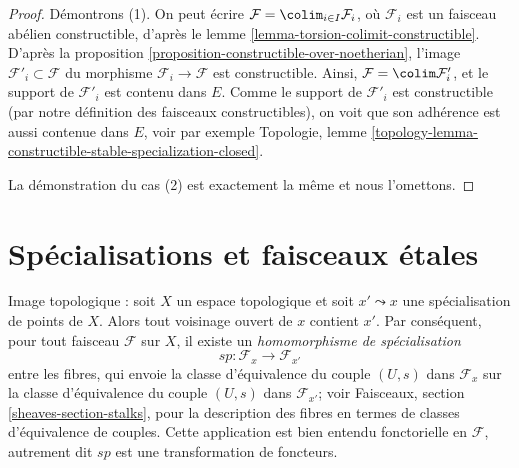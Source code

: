 \begin{proof}
Démontrons (1). On peut écrire $\mathcal{F} = \colim_{i \in I} \mathcal{F}_i$,
où $\mathcal{F}_i$ est un faisceau abélien constructible, d'après le
lemme \ref{lemma-torsion-colimit-constructible}.
D'après la proposition \ref{proposition-constructible-over-noetherian},
l'image $\mathcal{F}'_i \subset \mathcal{F}$
du morphisme $\mathcal{F}_i \to \mathcal{F}$ est constructible.
Ainsi, $\mathcal{F} = \colim \mathcal{F}'_i$, et le support
de $\mathcal{F}'_i$ est contenu dans $E$.
Comme le support de $\mathcal{F}'_i$ est constructible
(par notre définition des faisceaux constructibles), on voit
que son adhérence est aussi contenue dans $E$, voir par exemple
Topologie, lemme
\ref{topology-lemma-constructible-stable-specialization-closed}.

\medskip\noindent
La démonstration du cas (2) est exactement la même et nous l'omettons.
\end{proof}








\section{Spécialisations et faisceaux étales}
\label{section-specialization}

\noindent
Image topologique : soit $X$ un espace topologique et soit $x' \leadsto x$
une spécialisation de points de $X$. Alors tout voisinage ouvert de $x$
contient $x'$. Par conséquent, pour tout faisceau $\mathcal{F}$ sur $X$, il existe un
{\it homomorphisme de spécialisation}
$$
sp : \mathcal{F}_x \longrightarrow \mathcal{F}_{x'}
$$
entre les fibres, qui envoie la classe d'équivalence du couple $(U, s)$ dans
$\mathcal{F}_x$ sur la classe d'équivalence du couple $(U, s)$ dans
$\mathcal{F}_{x'}$; voir Faisceaux, section \ref{sheaves-section-stalks},
pour la description des fibres en termes de classes d'équivalence de couples.
Cette application est bien entendu fonctorielle en $\mathcal{F}$, autrement dit $sp$
est une transformation de foncteurs.

